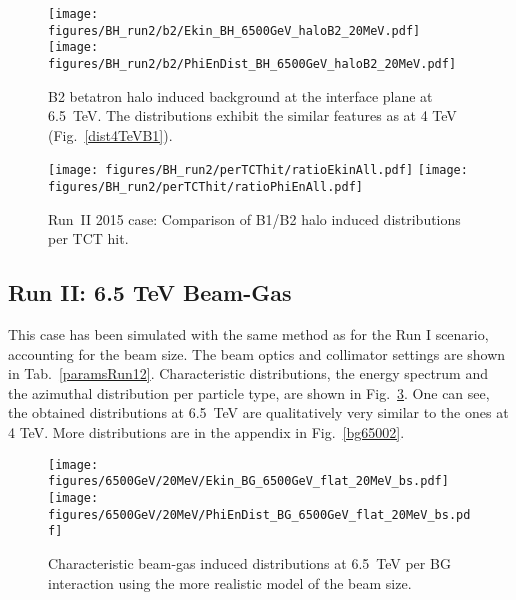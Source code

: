 \begin{figure}%
\centering
\texttt{[image: figures/BH\_run2/b2/Ekin\_BH\_6500GeV\_haloB2\_20MeV.pdf]}
\texttt{[image: figures/BH\_run2/b2/PhiEnDist\_BH\_6500GeV\_haloB2\_20MeV.pdf]}
 \caption{B2 betatron halo induced background at the interface plane at 6.5~TeV. The distributions exhibit the similar features as at 4 TeV (Fig.~\ref{dist4TeVB1}).
  \label{dist6500GeVB2}}
\end{figure}


\begin{figure}%
\centering
  \texttt{[image: figures/BH\_run2/perTCThit/ratioEkinAll.pdf]}
  \texttt{[image: figures/BH\_run2/perTCThit/ratioPhiEnAll.pdf]}
 \caption{Run~II 2015 case: Comparison of B1/B2 halo induced distributions per TCT hit.
  \label{compBHB1B2run2}}
\end{figure}



\subsection{Run II: 6.5 TeV Beam-Gas}

This case has been simulated with the same method as for the Run I scenario, accounting for the beam size. The beam optics and collimator settings are shown in Tab.~\ref{paramsRun12}. Characteristic distributions, the energy spectrum and the azimuthal distribution per particle type, are shown in Fig.~\ref{bg6500}. One can see, the obtained distributions at 6.5~TeV are qualitatively very similar to the ones at 4 TeV. More distributions are in the appendix in Fig.~\ref{bg65002}. 

\begin{figure}%
\begin{center}
  \texttt{[image: figures/6500GeV/20MeV/Ekin\_BG\_6500GeV\_flat\_20MeV\_bs.pdf]}
  \texttt{[image: figures/6500GeV/20MeV/PhiEnDist\_BG\_6500GeV\_flat\_20MeV\_bs.pdf]}
\end{center}
\vspace{-0.6cm}
 \caption{Characteristic beam-gas induced distributions at 6.5~TeV per BG interaction using the more realistic model of the beam size.
  \label{bg6500}}
\end{figure}


